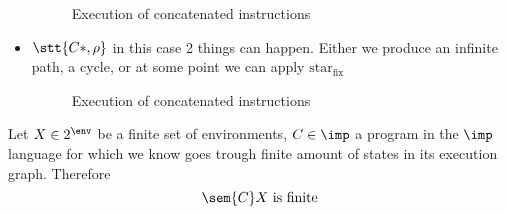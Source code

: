\begin{observation}
\begin{itemize}
\begin{figure}
      \caption{Execution of concatenated instructions}\label{fig:branch}
    \end{figure}
  \item \(\stt{C*, \rho}\) in this case 2 things can happen. Either we
    produce an infinite path, a cycle, or at some point we can apply
    \(\text{star}_{\text{fix}}\)
    \begin{figure}
      \centering
      \begin{tikzpicture}[->, >=stealth]
        

      \end{tikzpicture}
      \caption{Execution of concatenated instructions}\label{fig:branch}
    \end{figure}
    
  \end{itemize}
\end{observation}

\begin{lemma}\label{le:finite}
  Let \(X \in 2^\env\) be a finite set of environments, \(C \in \imp\)
  a program in the \(\imp\) language for which we know goes trough
  finite amount of states in its execution graph. Therefore \[\sem{C}X
  \text{ is finite}\]
\end{lemma}

